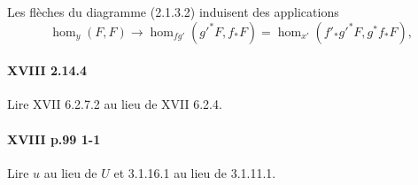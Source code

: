 Les flèches du diagramme (2.1.3.2) induisent des applications 
\[
  \hom_y(F,F) \to \hom_{f g'}({g'}^\ast F,f_\ast F) = \hom_{x'}(f'_\ast {g'}^\ast F,g^\ast f_\ast F) \text{,}
\]

\paragraph{XVIII 2.14.4}
Lire XVII 6.2.7.2 au lieu de XVII 6.2.4.

\paragraph{XVIII p.99 1-1}
Lire $u$ au lieu de $U$ et 3.1.16.1 au lieu de 3.1.11.1.

